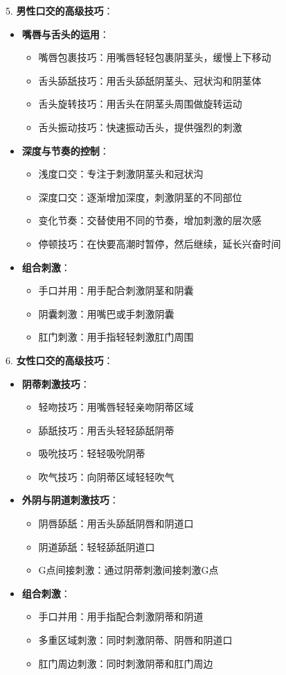 \documentclass[12pt,UTF8]{ctexbook}
\begin{document}
5. \textbf{男性口交的高级技巧}：
\begin{itemize}
	\item \textbf{嘴唇与舌头的运用}：
	\begin{itemize}
		\item 嘴唇包裹技巧：用嘴唇轻轻包裹阴茎头，缓慢上下移动
		\item 舌头舔舐技巧：用舌头舔舐阴茎头、冠状沟和阴茎体
		\item 舌头旋转技巧：用舌头在阴茎头周围做旋转运动
		\item 舌头振动技巧：快速振动舌头，提供强烈的刺激
	\end{itemize}
	\item \textbf{深度与节奏的控制}：
	\begin{itemize}
		\item 浅度口交：专注于刺激阴茎头和冠状沟
		\item 深度口交：逐渐增加深度，刺激阴茎的不同部位
		\item 变化节奏：交替使用不同的节奏，增加刺激的层次感
		\item 停顿技巧：在快要高潮时暂停，然后继续，延长兴奋时间
	\end{itemize}
	\item \textbf{组合刺激}：
	\begin{itemize}
		\item 手口并用：用手配合刺激阴茎和阴囊
		\item 阴囊刺激：用嘴巴或手刺激阴囊
		\item 肛门刺激：用手指轻轻刺激肛门周围
	\end{itemize}
\end{itemize}

6. \textbf{女性口交的高级技巧}：
\begin{itemize}
	\item \textbf{阴蒂刺激技巧}：
	\begin{itemize}
		\item 轻吻技巧：用嘴唇轻轻亲吻阴蒂区域
		\item 舔舐技巧：用舌头轻轻舔舐阴蒂
		\item 吸吮技巧：轻轻吸吮阴蒂
		\item 吹气技巧：向阴蒂区域轻轻吹气
	\end{itemize}
	\item \textbf{外阴与阴道刺激技巧}：
	\begin{itemize}
		\item 阴唇舔舐：用舌头舔舐阴唇和阴道口
		\item 阴道舔舐：轻轻舔舐阴道口
		\item G点间接刺激：通过阴蒂刺激间接刺激G点
	\end{itemize}
	\item \textbf{组合刺激}：
	\begin{itemize}
		\item 手口并用：用手指配合刺激阴蒂和阴道
		\item 多重区域刺激：同时刺激阴蒂、阴唇和阴道口
		\item 肛门周边刺激：同时刺激阴蒂和肛门周边
	\end{itemize}
\end{itemize}
\end{document}
